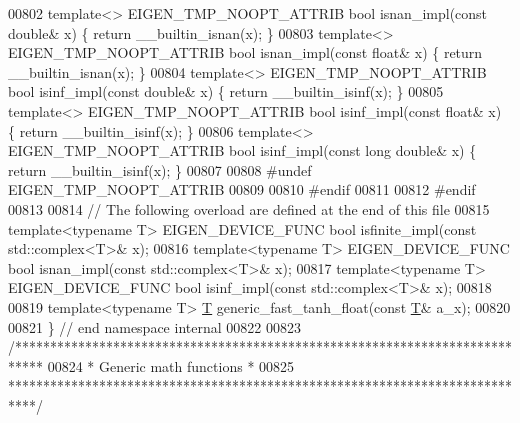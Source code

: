 \begin{DoxyCode}
00802 \textcolor{keyword}{template}<> EIGEN\_TMP\_NOOPT\_ATTRIB \textcolor{keywordtype}{bool} isnan\_impl(\textcolor{keyword}{const} \textcolor{keywordtype}{double}& x)      \{ \textcolor{keywordflow}{return} \_\_builtin\_isnan(x); \}
00803 \textcolor{keyword}{template}<> EIGEN\_TMP\_NOOPT\_ATTRIB \textcolor{keywordtype}{bool} isnan\_impl(\textcolor{keyword}{const} \textcolor{keywordtype}{float}& x)       \{ \textcolor{keywordflow}{return} \_\_builtin\_isnan(x); \}
00804 \textcolor{keyword}{template}<> EIGEN\_TMP\_NOOPT\_ATTRIB \textcolor{keywordtype}{bool} isinf\_impl(\textcolor{keyword}{const} \textcolor{keywordtype}{double}& x)      \{ \textcolor{keywordflow}{return} \_\_builtin\_isinf(x); \}
00805 \textcolor{keyword}{template}<> EIGEN\_TMP\_NOOPT\_ATTRIB \textcolor{keywordtype}{bool} isinf\_impl(\textcolor{keyword}{const} \textcolor{keywordtype}{float}& x)       \{ \textcolor{keywordflow}{return} \_\_builtin\_isinf(x); \}
00806 \textcolor{keyword}{template}<> EIGEN\_TMP\_NOOPT\_ATTRIB \textcolor{keywordtype}{bool} isinf\_impl(\textcolor{keyword}{const} \textcolor{keywordtype}{long} \textcolor{keywordtype}{double}& x) \{ \textcolor{keywordflow}{return} \_\_builtin\_isinf(x); \}
00807 
00808 \textcolor{preprocessor}{#undef EIGEN\_TMP\_NOOPT\_ATTRIB}
00809 
00810 \textcolor{preprocessor}{#endif}
00811 
00812 \textcolor{preprocessor}{#endif}
00813 
00814 \textcolor{comment}{// The following overload are defined at the end of this file}
00815 \textcolor{keyword}{template}<\textcolor{keyword}{typename} T> EIGEN\_DEVICE\_FUNC \textcolor{keywordtype}{bool} isfinite\_impl(\textcolor{keyword}{const} std::complex<T>& x);
00816 \textcolor{keyword}{template}<\textcolor{keyword}{typename} T> EIGEN\_DEVICE\_FUNC \textcolor{keywordtype}{bool} isnan\_impl(\textcolor{keyword}{const} std::complex<T>& x);
00817 \textcolor{keyword}{template}<\textcolor{keyword}{typename} T> EIGEN\_DEVICE\_FUNC \textcolor{keywordtype}{bool} isinf\_impl(\textcolor{keyword}{const} std::complex<T>& x);
00818 
00819 \textcolor{keyword}{template}<\textcolor{keyword}{typename} T> \hyperlink{group___sparse_core___module_class_eigen_1_1_triplet}{T} generic\_fast\_tanh\_float(\textcolor{keyword}{const} \hyperlink{group___sparse_core___module_class_eigen_1_1_triplet}{T}& a\_x);
00820 
00821 \} \textcolor{comment}{// end namespace internal}
00822 
00823 \textcolor{comment}{/****************************************************************************}
00824 \textcolor{comment}{* Generic math functions                                                    *}
00825 \textcolor{comment}{****************************************************************************/}

\end{DoxyCode}
